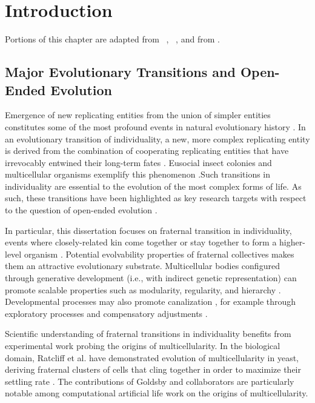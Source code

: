 \chapter{Introduction}
\label{ch:introduction}

\noindent
Portions of this chapter are adapted from ~\citep{moreno2019toward}, ~\citep{moreno2020practical}, and from \citep{moreno2020profiling}.

\section{Major Evolutionary Transitions and Open-Ended Evolution}

Emergence of new replicating entities from the union of simpler entities constitutes some of the most profound events in natural evolutionary history \citep{smith1997major}.
In an evolutionary transition of individuality, a new, more complex replicating entity is derived from the combination of cooperating replicating entities that have irrevocably entwined their long-term fates \citep{west2015major}.
Eusocial insect colonies and multicellular organisms exemplify this phenomenon \citep{smith1997major}.Such transitions in individuality are essential to the evolution of the most complex forms of life.
As such, these transitions have been highlighted as key research targets with respect to the question of open-ended evolution \citep{ray1996evolving, banzhaf2016defining}.

In particular, this dissertation focuses on fraternal transition in individuality, events where closely-related kin come together or stay together to form a higher-level organism \citep{queller1997cooperators}.
Potential evolvability properties of fraternal collectives makes them an attractive evolutionary substrate.
Multicellular bodies configured through generative development (i.e., with indirect genetic representation) can promote scalable properties \citep{lipson2007principles} such as modularity, regularity, and hierarchy \citep{hornby2005measuring, clune2011performance}.
Developmental processes may also promote canalization \citep{stanley2003taxonomy}, for example through exploratory processes and compensatory adjustments \citep{gerhart2007theory}.

Scientific understanding of fraternal transitions in individuality benefits from experimental work probing the origins of multicellularity.
In the biological domain, Ratcliff et al. have demonstrated evolution of multicellularity in yeast, deriving fraternal clusters of cells that cling together in order to maximize their settling rate \citep{ratcliff2012experimental}.
The contributions of Goldsby and collaborators are particularly notable among computational artificial life work on the origins of multicellularity.

